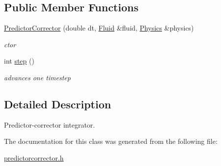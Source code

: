 \subsection*{\-Public \-Member \-Functions}
\begin{DoxyCompactItemize}
\item 
\hypertarget{classPredictorCorrector_ad39d1bbacf7a674d630a44ec67c6e2c0}{\hyperlink{classPredictorCorrector_ad39d1bbacf7a674d630a44ec67c6e2c0}{\-Predictor\-Corrector} (double dt, \hyperlink{classFluid}{\-Fluid} \&fluid, \hyperlink{classPhysics}{\-Physics} \&physics)}\label{classPredictorCorrector_ad39d1bbacf7a674d630a44ec67c6e2c0}

\begin{DoxyCompactList}\small\item\em ctor \end{DoxyCompactList}\item 
\hypertarget{classPredictorCorrector_aec41b3501a2d94a04e74395f9877ad6f}{int \hyperlink{classPredictorCorrector_aec41b3501a2d94a04e74395f9877ad6f}{step} ()}\label{classPredictorCorrector_aec41b3501a2d94a04e74395f9877ad6f}

\begin{DoxyCompactList}\small\item\em advances one timestep \end{DoxyCompactList}\end{DoxyCompactItemize}


\subsection{\-Detailed \-Description}
\-Predictor-\/corrector integrator. 

\-The documentation for this class was generated from the following file\-:\begin{DoxyCompactItemize}
\item 
\hyperlink{predictorcorrector_8h}{predictorcorrector.\-h}\end{DoxyCompactItemize}

